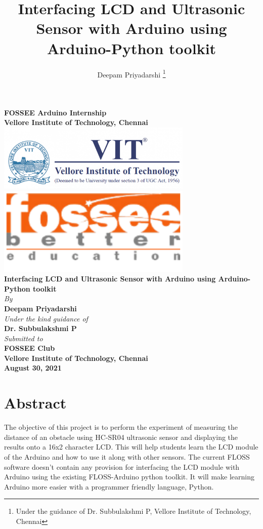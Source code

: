 \documentclass{article}
\title{Interfacing LCD and Ultrasonic Sensor with Arduino using Arduino-Python toolkit}
\author{Deepam Priyadarshi \thanks{Under the guidance of Dr. Subbulakshmi P, Vellore Institute of Technology, Chennai}}
\date{}
\begin{document}
\begin{center}
		\textbf{\huge FOSSEE Arduino Internship\\Vellore Institute of Technology, Chennai\\}
		\vspace{30pt}
		\includegraphics[width=0.7\textwidth]{./logo.png} \\
		\includegraphics[width=0.7\textwidth]{./fossee.png} \\
		\vspace{20pt}
		\textbf{\Large Interfacing LCD and Ultrasonic Sensor with Arduino using Arduino-Python toolkit\\}
		\vspace{30pt}
		\textit{By\\}
		\textbf{\large Deepam Priyadarshi\\}
		\vspace{20pt}
		\textit{Under the kind guidance of}\\
		\textbf{\large Dr. Subbulakshmi P}\\
		\vspace{35pt}
		\textit{Submitted to}\\
		\textbf{\large FOSSEE Club\\
			Vellore Institute of Technology, Chennai\\
			August 30, 2021
		}
\end{center}
\pagebreak
\maketitle

\section{Abstract}
The objective of this project is to perform the experiment of measuring the distance of an obstacle using HC-SR04 ultrasonic sensor and displaying the results onto a 16x2 character LCD. This will help students learn the LCD module of the Arduino and how to use it along with other sensors. The current FLOSS software doesn't contain any provision for interfacing the LCD module with Arduino using the existing FLOSS-Arduino python toolkit. It will make learning Arduino more easier with a programmer friendly language, Python.
\end{document}
